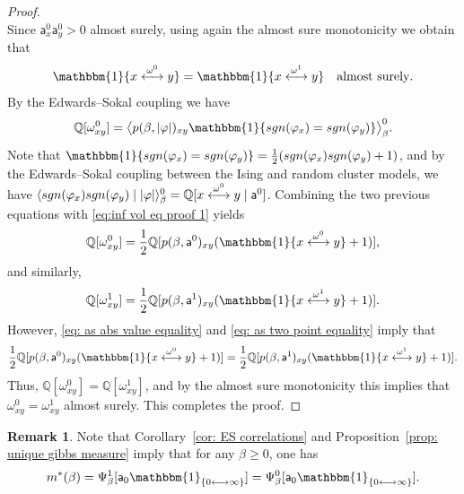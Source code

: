 \documentclass[11pt,a4paper]{article}
\theoremstyle{definition}
\newtheorem{remark}[theorem]{Remark}
\numberwithin{equation}{section}
\begin{document}
\begin{proof}
\begin{equation}
\end{equation}
Since $\mathsf{a}^0_x \mathsf{a}^0_y>0$ almost surely, using again the almost sure monotonicity we obtain that
\begin{equation}\label{eq: as two point equality}
\mathbbm{1}\{x\overset{\omega^0}{\longleftrightarrow} y\} =\mathbbm{1}\{x\overset{\omega^1}{\longleftrightarrow} y\} 
\quad \text{almost surely}.
\end{equation}
By the Edwards--Sokal coupling we have 
\begin{equation}\label{eq:inf vol eq proof 1}
\mathbb{Q}[\omega^0_{xy}]=\big\langle p(\beta,|\varphi|)_{xy} \mathbbm{1}\{\textup{sgn}(\varphi_x)=\textup{sgn}(\varphi_y)\} \big\rangle^0_{\beta}. \end{equation}
Note that 
$\mathbbm{1}\{\textup{sgn}(\varphi_x)=\textup{sgn}(\varphi_y)\}=\frac{1}{2}(\textup{sgn}(\varphi_x)\textup{sgn}(\varphi_y)+1)$,
and by the Edwards--Sokal coupling between the Ising and random cluster models, we have
$
\langle \textup{sgn}(\varphi_x)\textup{sgn}(\varphi_y) \mid |\varphi| \rangle^0_{\beta}= \mathbb{Q}[x\overset{\omega^0}{\longleftrightarrow} y \mid \mathsf{a}^0]
$.
Combining the two previous equations with \eqref{eq:inf vol eq proof 1} yields
\begin{equation}\label{eq: omega connectivity equality}
\mathbb{Q}[\omega^0_{xy}]=\frac{1}{2}\mathbb{Q}[p(\beta,\mathsf{a}^0)_{xy}(\mathbbm{1}\{x\overset{\omega^0}{\longleftrightarrow} y\}+1)],    
\end{equation}
and similarly,
\begin{equation}
\mathbb{Q}[\omega^1_{xy}]=\frac{1}{2}\mathbb{Q}[p(\beta,\mathsf{a}^1)_{xy}(\mathbbm{1}\{x\overset{\omega^1}{\longleftrightarrow} y\}+1)].    
\end{equation}
However, \eqref{eq: as abs value equality} and \eqref{eq: as two point equality} imply that
\begin{equation}
\frac{1}{2}\mathbb{Q}[p(\beta,\mathsf{a}^0)_{xy}(\mathbbm{1}\{x\overset{\omega^0}{\longleftrightarrow} y\}+1)]=\frac{1}{2}\mathbb{Q}[p(\beta,\mathsf{a}^1)_{xy}(\mathbbm{1}\{x\overset{\omega^1}{\longleftrightarrow} y\}+1)].   
\end{equation}
Thus, $\mathbb{Q}[\omega^0_{xy}]=\mathbb{Q}[\omega^1_{xy}]$, and by the almost sure monotonicity this implies that $\omega^0_{xy}=\omega^1_{xy}$ almost surely. This completes the proof.
\end{proof}

\begin{remark}\label{rem: equality of magnetisation} Note that Corollary~\textup{\ref{cor: ES correlations}}  and Proposition~\textup{\ref{prop: unique gibbs measure}} imply that for any $\beta\geq 0$, one has
\begin{equation}
m^*(\beta)=\Psi^1_\beta[\mathsf{a}_0 \mathbbm{1}_{\{0\longleftrightarrow\infty\}}]=\Psi^0_\beta[\mathsf{a}_0 \mathbbm{1}_{\{0\longleftrightarrow\infty\}}].
\end{equation}
\end{remark}
\end{document}
